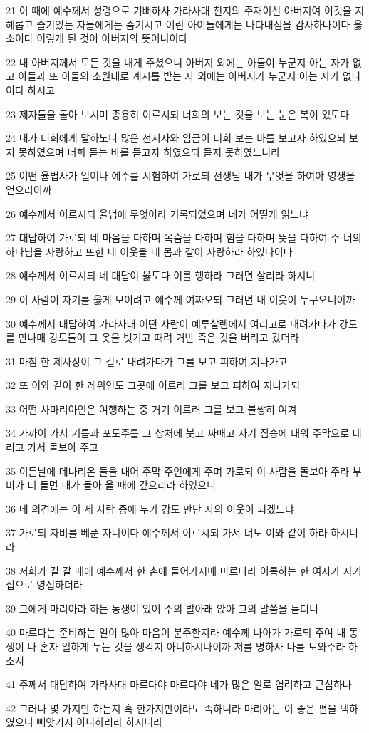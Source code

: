 \par 21 이 때에 예수께서 성령으로 기뻐하사 가라사대 천지의 주재이신 아버지여 이것을 지혜롭고 슬기있는 자들에게는 숨기시고 어린 아이들에게는 나타내심을 감사하나이다 옳소이다 이렇게 된 것이 아버지의 뜻이니이다
\par 22 내 아버지께서 모든 것을 내게 주셨으니 아버지 외에는 아들이 누군지 아는 자가 없고 아들과 또 아들의 소원대로 계시를 받는 자 외에는 아버지가 누군지 아는 자가 없나이다 하시고
\par 23 제자들을 돌아 보시며 종용히 이르시되 너희의 보는 것을 보는 눈은 복이 있도다
\par 24 내가 너희에게 말하노니 많은 선지자와 임금이 너희 보는 바를 보고자 하였으되 보지 못하였으며 너희 듣는 바를 듣고자 하였으되 듣지 못하였느니라
\par 25 어떤 율법사가 일어나 예수를 시험하여 가로되 선생님 내가 무엇을 하여야 영생을 얻으리이까
\par 26 예수께서 이르시되 율법에 무엇이라 기록되었으며 네가 어떻게 읽느냐
\par 27 대답하여 가로되 네 마음을 다하며 목숨을 다하며 힘을 다하며 뜻을 다하여 주 너의 하나님을 사랑하고 또한 네 이웃을 네 몸과 같이 사랑하라 하였나이다
\par 28 예수께서 이르시되 네 대답이 옳도다 이를 행하라 그러면 살리라 하시니
\par 29 이 사람이 자기를 옳게 보이려고 예수께 여짜오되 그러면 내 이웃이 누구오니이까
\par 30 예수께서 대답하여 가라사대 어떤 사람이 예루살렘에서 여리고로 내려가다가 강도를 만나매 강도들이 그 옷을 벗기고 때려 거반 죽은 것을 버리고 갔더라
\par 31 마침 한 제사장이 그 길로 내려가다가 그를 보고 피하여 지나가고
\par 32 또 이와 같이 한 레위인도 그곳에 이르러 그를 보고 피하여 지나가되
\par 33 어떤 사마리아인은 여행하는 중 거기 이르러 그를 보고 불쌍히 여겨
\par 34 가까이 가서 기름과 포도주를 그 상처에 붓고 싸매고 자기 짐승에 태워 주막으로 데리고 가서 돌보아 주고
\par 35 이튿날에 데나리온 둘을 내어 주막 주인에게 주며 가로되 이 사람을 돌보아 주라 부비가 더 들면 내가 돌아 올 때에 갚으리라 하였으니
\par 36 네 의견에는 이 세 사람 중에 누가 강도 만난 자의 이웃이 되겠느냐
\par 37 가로되 자비를 베푼 자니이다 예수께서 이르시되 가서 너도 이와 같이 하라 하시니라
\par 38 저희가 길 갈 때에 예수께서 한 촌에 들어가시매 마르다라 이름하는 한 여자가 자기 집으로 영접하더라
\par 39 그에게 마리아라 하는 동생이 있어 주의 발아래 앉아 그의 말씀을 듣더니
\par 40 마르다는 준비하는 일이 많아 마음이 분주한지라 예수께 나아가 가로되 주여 내 동생이 나 혼자 일하게 두는 것을 생각지 아니하시나이까 저를 명하사 나를 도와주라 하소서
\par 41 주께서 대답하여 가라사대 마르다야 마르다야 네가 많은 일로 염려하고 근심하나
\par 42 그러나 몇 가지만 하든지 혹 한가지만이라도 족하니라 마리아는 이 좋은 편을 택하였으니 빼앗기지 아니하리라 하시니라

